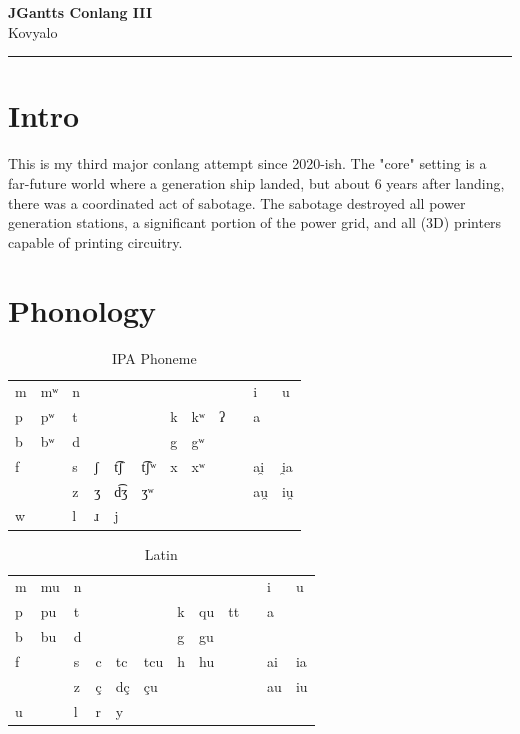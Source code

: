 \documentclass[11pt]{article}
\newcommand{\customtitle}[1]{
    \begin{center}
        \vspace*{2cm}
        {\Huge\bfseries\color{primary} #1}\\
        \vspace{0.5cm}
        {\Large Kovyalo}\\
        \vspace{1cm}
    \end{center}
    \vspace{1cm}
    \hrule
    \vspace{1cm}
}
\begin{document}
\pagecolor{background}

\customtitle{JGantts Conlang III}

\section{Intro}
This is my third major conlang attempt since 2020-ish.
The "core" setting is a far-future world where a generation ship landed,
but about 6 years after landing, there was a coordinated act of sabotage.
The sabotage destroyed all power generation stations, a significant portion
of the power grid, and all (3D) printers capable of printing circuitry.

\section{Phonology}

\begin{table}[H]
\begin{center}
\caption{IPA Phoneme}
\label{table-phonemes-ipa}
\begin{tabular}{l l l l l l l l l l l l}
 m & mʷ & n & & & &   &    &   & & i & u \\
 p & pʷ & t & & & & k & kʷ & ʔ & & a &  \\
 b & bʷ & d & & & & g & gʷ &   & &  &  \\
 f & & s & ʃ & t͡ʃ & t͡ʃʷ & x & xʷ & & & ai̯ & i̯a \\
 & & z & ʒ & d͡ʒ & ʒʷ & & & & & au̯ & iu̯ \\
 w & & l & ɹ & j & & & & & & & \\
\end{tabular}
\end{center}
\end{table}

\begin{table}[H]
\begin{center}
\caption{Latin}
\label{table-phonemes-latin}
\begin{tabular}{l l l l l l l l l l l l}
 m & mu & n & & & &   &    &    & & i & u \\
 p & pu & t & & & & k & qu & tt & & a &  \\
 b & bu & d & & & & g & gu &    & &  &  \\
 f & & s & c & tc & tcu & h & hu & & & ai & ia \\
 & & z & ç & dç & çu & & & & & au & iu \\
 u & & l & r & y & & & & \\
\end{tabular}
\end{center}
\end{table}
\end{document}
